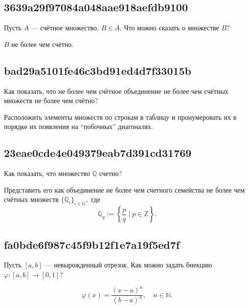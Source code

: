 \documentclass[11pt, a5paper]{article}
\newenvironment{note}[1]{\goodbreak\par\subsection{\hfill \color{lightgray}\tiny #1}}{}
\newenvironment{cloze}[2][\ldots]{\begin{leftbar}}{\end{leftbar}}
\begin{document}
    \begin{note}{3639a29f97084a048aae918aefdb9100}
        Пусть \( A \) --- счётное множество, \( B \in A. \) Что можно сказать о
        множестве \( B? \)

        \begin{cloze}{1}
            \( B \) не более чем счётно.
        \end{cloze}
    \end{note}

    \begin{note}{bad29a5101fe46c3bd91ed4d7f33015b}
        Как показать, что не более чем счётное объединение не более чем счётных
        множеств не более чем счётно?

        \begin{cloze}{1}
            Расположить элементы множеств по строкам в таблицу и пронумеровать
            их в порядке их появления на ``побочных'' диагоналях.
        \end{cloze}
    \end{note}

    \begin{note}{23eae0cde4e049379eab7d391cd31769}
        Как показать, что множество \( \mathbb Q  \) счетно?

        \begin{cloze}{1}
            Представить его как объединение не более чем счетного семейства не
            более чем счётных множеств \( \{ \mathbb Q _i \}_{i \in \mathbb N }
            , \) где \[
                \mathbb Q _q := \left\{ \frac{p}{q} \mid p \in \mathbb Z  \right\}.
            \]
        \end{cloze}
    \end{note}

    \begin{note}{fa0bde6f987c45f9b12f1e7a19f5ed7f}
        Пусть \( [a,  b] \) --- невырожденный отрезок. Как можно задать биекцию
        \( \varphi : [a,  b] \to [0, 1] \)?

        \begin{cloze}{1}
            \[
                \varphi(x) = \frac{(x - a)^{n}}{(b - a)^{n}}, \quad n \in
                \mathbb N.
            \]
        \end{cloze}
    \end{note}
\end{document}
